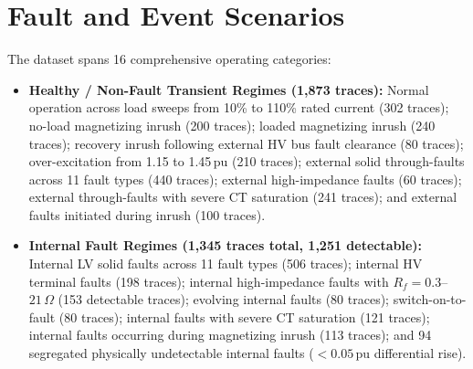 \documentclass[12pt,a4paper,oneside]{report}
\begin{document}
\section{Fault and Event Scenarios}
The dataset spans 16 comprehensive operating categories:
\begin{itemize}[leftmargin=1.4em,itemsep=2pt]
\item \textbf{Healthy / Non-Fault Transient Regimes (1,873 traces):} Normal operation across load sweeps from 10\% to 110\% rated current (302 traces); no-load magnetizing inrush (200 traces); loaded magnetizing inrush (240 traces); recovery inrush following external HV bus fault clearance (80 traces); over-excitation from 1.15 to 1.45\,pu (210 traces); external solid through-faults across 11 fault types (440 traces); external high-impedance faults (60 traces); external through-faults with severe CT saturation (241 traces); and external faults initiated during inrush (100 traces).
\item \textbf{Internal Fault Regimes (1,345 traces total, 1,251 detectable):} Internal LV solid faults across 11 fault types (506 traces); internal HV terminal faults (198 traces); internal high-impedance faults with $R_f = 0.3$--$21\,\Omega$ (153 detectable traces); evolving internal faults (80 traces); switch-on-to-fault (80 traces); internal faults with severe CT saturation (121 traces); internal faults occurring during magnetizing inrush (113 traces); and 94 segregated physically undetectable internal faults ($<0.05$\,pu differential rise).
\end{itemize}
\end{document}
